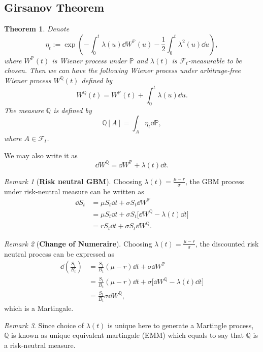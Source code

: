 \documentclass[10pt]{article}
\theoremstyle{remark}
\newtheorem{Remark}{Remark}[section]
\theoremstyle{plain}
\newtheorem{Theorem}{Theorem}[section]
\numberwithin{equation}{section}
\begin{document}
\subsection{Girsanov Theorem}
\begin{Theorem}
	Denote
	\[
		\eta_t := \exp(-\int_0^t \lambda(u) \dd{W^\mathbb{P}(u)} - \frac{1}{2} \int_0^t \lambda^2(u) \dd{u}), 
	\]
	where $W^\mathbb{P}(t)$ is Wiener process under $\mathbb{P}$ and $\lambda(t) $ is $\mathcal{F}_t$-measurable to be chosen. Then we can have the following Wiener process under arbitrage-free Wiener process $W^\mathbb{Q}(t)$ defined by
	\[
		W^\mathbb{Q}(t) = W^\mathbb{P}(t) + \int_0^t \lambda(u) \dd{u}. 
	\]
	The measure $\mathbb{Q}$ is defined by 
	\[
	\mathbb{Q}[A] = \int_A \eta_t \dd{\mathbb{P}},
	\]
	where $A \in \mathcal{F}_t$.
\end{Theorem}

We may also write it as 
	\begin{equation}
		\dd{W^\mathbb{Q}} = \dd{W^\mathbb{P}} + \lambda(t) \dd{t}.
	\end{equation}
\begin{Remark}[\textbf{Risk neutral GBM}]
	Choosing $\lambda(t) = \frac{\mu - r}{\sigma}$, the GBM process under risk-neutral measure can be written as
	\begin{align*}
		\dd{S_t} & = \mu S_t \dd{t} + \sigma S_t \dd{W^\mathbb{P}}
		\\
		& = \mu S_t \dd{t} + \sigma S_t \big[\dd{W^\mathbb{Q}} - \lambda(t) \dd{t} \big]
		\\
		& = r S_t \dd{t} + \sigma S_t \dd{W^\mathbb{Q}}.
	\end{align*}
\end{Remark}

\begin{Remark}[\textbf{Change of Numeraire}]
	Choosing $\lambda(t) = \frac{\mu - r}{\sigma}$, the discounted risk neutral process can be expressed as
	\begin{align*}
		\dd{\left(\frac{S_t}{B_t}\right)} & = \frac{S_t}{B_t} (\mu - r) \dd{t} + \sigma \dd{W^\mathbb{P}}
		\\
		& = \frac{S_t}{B_t} (\mu - r) \dd{t} + \sigma \big[\dd{W^\mathbb{Q}} - \lambda(t) \dd{t} \big]
		\\
		& = \frac{S_t}{B_t} \sigma \dd{W^\mathbb{Q}},
	\end{align*}
	which is a Martingale.
\end{Remark}


\begin{Remark}
	Since choice of $\lambda(t)$ is unique here to generate a Martingle process, $\mathbb{Q}$ is known as unique equivalent martingale (EMM) which equals to say that $\mathbb{Q}$ is a risk-neutral measure.
\end{Remark}
\end{document}
